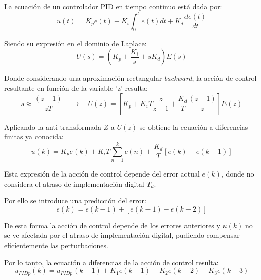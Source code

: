 La ecuación de un controlador PID en tiempo continuo está dada por: \cite{BotteronSC1}
\begin{equation}
u(t)=K_pe(t)+K_i\int _0^t e(t)dt +K_d\frac{de(t)}{dt}
\end{equation} \par 
Siendo su expresión en el dominio de Laplace:
\begin{equation}
U(s)=(K_p+\frac{K_i}{s}+sK_d)E(s)
\end{equation}\par 
Donde considerando una aproximación rectangular \textit{backward}, la acción de control resultante en función de la variable 'z' resulta:
\begin{equation}
s\approx\frac{(z-1)}{zT} \quad \to \quad U(z)=[K_p+K_iT\frac{z}{z-1}+\frac{K_d}{T}\frac{(z-1)}{z}]E(z)
\end{equation}\par 
Aplicando la anti-transformada $Z$ a $U(z)$ se obtiene la ecuación a diferencias finitas ya conocida:
\begin{equation}
u(k)=K_pe(k)+K_iT\sum_{n=1}^k e(n)+\frac{K_d}{T}[e(k)-e(k-1)]
\end{equation}\par 
Esta expresión de la acción de control depende del error actual $e(k)$, donde no considera el atraso de implementación digital $T_d$. \par 
Por ello se introduce una predicción del error:
\begin{equation}
e(k)=e(k-1)+[e(k-1)-e(k-2)]
\end{equation}\par 
De esta forma la acción de control depende de los errores anteriores y $u(k)$ no se ve afectada por el atraso de implementación digital, pudiendo compensar eficientemente las perturbaciones. \par 
Por lo tanto, la ecuación a diferencias de la acción de control resulta:
\begin{equation} \label{eq:PIDp}
u_{PIDp}(k)=u_{PIDp}(k-1)+K_1e(k-1)+K_2e(k-2)+K_3e(k-3)
\end{equation}\par 


